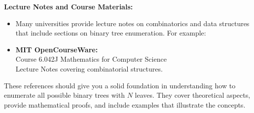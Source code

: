 \documentclass{article}
\begin{document}
\textbf{Lecture Notes and Course Materials:}
\begin{itemize}
    \item Many universities provide lecture notes on combinatorics and data structures that include sections on binary tree enumeration. For example:
    \item \textbf{MIT OpenCourseWare:} \\
    Course 6.042J Mathematics for Computer Science \\
    Lecture Notes covering combinatorial structures.
\end{itemize}

These references should give you a solid foundation in understanding how to enumerate all possible binary trees with $N$ leaves. They cover theoretical aspects, provide mathematical proofs, and include examples that illustrate the concepts.

\end{document}
